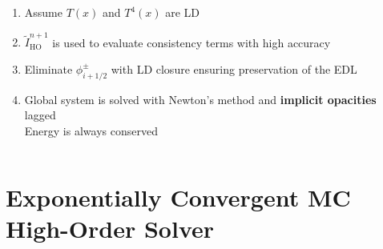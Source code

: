 \documentclass[xcolor=dvipsnames,hyperref={pdfpagelabels=false},unknownkeysallowed]{beamer}
\newcommand{\colb}[1]{{\color{blue} #1}}
\newcommand{\colG}[1]{{\color{Gray!110} #1}}
\newlength{\wideitemsep}
\let\olditem\item
\renewcommand{\item}{\setlength{\itemsep}{\wideitemsep}\olditem}
\newcommand{\mom}[1]{\langle #1 \rangle}
\begin{document}
\begin{frame}
\begin{columns}
\begin{column}{0.75\linewidth}
    \begin{enumerate}
        \item Assume $T(x)$ and $T^4(x)$ are LD 
        \item \colb{ $\tilde{I}_{\text{HO}}^{n+1}$} is used to evaluate
            consistency terms with high accuracy
        \item Eliminate $\phi_{i+1/2}^\pm$ with LD closure
            \colG{ensuring preservation of the EDL}
            \begin{center}{\textcolor{Gray}{%
                    \fbox{ {\color{black} $\displaystyle  
      \phi_{i+1/2}^+ = 2\mom{\phi}_{R,i}^+ - \mom{\phi}_{L,i}^+$}}}}
            \end{center}
       \item Global system is solved with Newton's method and \textbf{implicit
           opacities}
           lagged\\ \colG{Energy is always conserved}
       \end{enumerate}
    \end{column}
\end{columns}
\end{frame}



\section{Exponentially Convergent MC High-Order Solver}
\subsection{}
\end{document}
